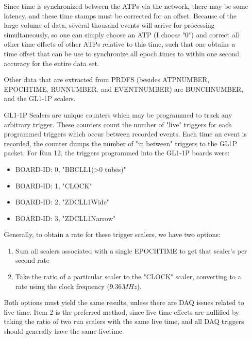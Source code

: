 Since time is synchronized between the ATPs via the network, there may be some
latency, and these time stamps must be corrected for an offset.  Because of the
large volume of data, several thousand events will arrive for processing
simultaneously, so one can simply choose an ATP (I choose "0") and correct all
other time offsets of other ATPs relative to this time, such that one obtains a
time offset that can be use to synchronize all epoch times to within one second
accuracy for the entire data set.

Other data that are extracted from PRDFS (besides ATPNUMBER, EPOCHTIME,
RUNNUMBER, and EVENTNUMBER) are BUNCHNUMBER, and the GL1-1P scalers.

GL1-1P Scalers are unique counters which may be programmed to track any
arbitrary trigger. These counters count the number of "live" triggers for each
programmed triggers which occur between recorded events. Each time an event is
recorded, the counter dumps the number of "in between" triggers to the GL1P
packet. For Run 12, the triggers programmed into the GL1-1P boards were:

\begin{itemize}
\item BOARD-ID: 0, "BBCLL1(\textgreater0 tubes)"
\item BOARD-ID: 1, "CLOCK"
\item BOARD-ID: 2, "ZDCLL1Wide"
\item BOARD-ID: 3, "ZDCLL1Narrow"
\end{itemize}

Generally, to obtain a rate for these trigger scalers, we have two options:
\begin{enumerate}
\item Sum all scalers associated with a single EPOCHTIME to get that scaler's
  per second rate
\item Take the ratio of a particular scaler to the "CLOCK" scaler, converting
  to a rate using the clock frequency ($9.36MHz$).
\end{enumerate}

Both options must yield the same results, unless there are DAQ issues related
to live time. Item 2 is the preferred method, since live-time effects are
nullified by taking the ratio of two run scalers with the same live time, and
all DAQ triggers should generally have the same livetime.

